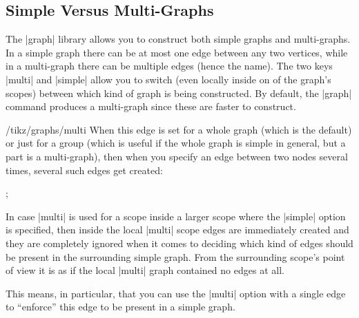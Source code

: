 \subsection{Simple Versus Multi-Graphs}

\label{section-library-graphs-simple}

The |graph| library allows you to construct both simple graphs and
multi-graphs. In a simple graph there can be at most one edge between
any two vertices, while in a multi-graph there can be multiple edges
(hence the name). The two keys |multi| and |simple| allow you to
switch (even locally inside on of the graph's scopes) between which
kind of graph is being constructed. By default, the |graph| command
produces a multi-graph since these are faster to construct.

\begin{key}{/tikz/graphs/multi}
  When this edge is set for a whole graph (which is the default) or
  just for a group (which is useful if the whole graph is simple in
  general, but a part is a multi-graph), then when you specify an edge
  between two nodes several times, several such edges get created:

\begin{codeexample}[]
\tikz {};
\end{codeexample}
  In case |multi| is used for a scope inside a larger scope where the
  |simple| option is specified, then inside the local |multi| scope
  edges are immediately created and they are completely ignored when
  it comes to deciding which kind of edges should be present in the
  surrounding simple graph. From the surrounding scope's point of view
  it is as if the local |multi| graph contained no edges at all.

  This means, in particular, that you can use the |multi| option with
  a single edge to ``enforce'' this edge to be present in a simple
  graph. 
\end{key}

